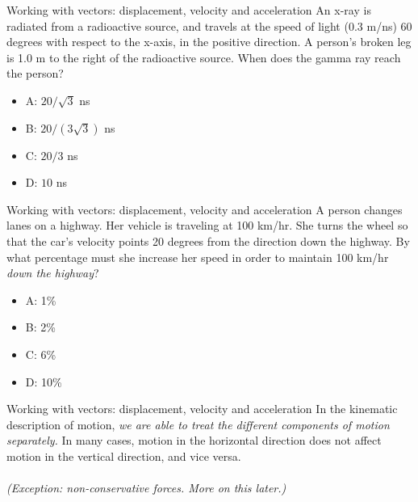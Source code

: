 \documentclass{beamer}
\begin{document}
\begin{frame}{Working with vectors: displacement, velocity and acceleration}
An x-ray is radiated from a radioactive source, and travels at the speed of light (0.3 m/ns) 60 degrees with respect to the x-axis, in the positive direction.  A person's broken leg is 1.0 m to the right of the radioactive source.  When does the gamma ray reach the person?
\begin{itemize}
\item A: $20/\sqrt{3}$ ns
\item B: $20/(3\sqrt{3})$ ns
\item C: $20/3$ ns
\item D: $10$ ns
\end{itemize}
\end{frame}

\begin{frame}{Working with vectors: displacement, velocity and acceleration}
A person changes lanes on a highway.  Her vehicle is traveling at 100 km/hr.  She turns the wheel so that the car's velocity points 20 degrees from the direction down the highway.  By what percentage must she increase her speed in order to maintain 100 km/hr \textit{down the highway}?
\begin{itemize}
\item A: 1\%
\item B: 2\%
\item C: 6\%
\item D: 10\%
\end{itemize}
\end{frame}

\begin{frame}{Working with vectors: displacement, velocity and acceleration}
In the kinematic description of motion, \alert{\textit{we are able to treat the different components of motion separately.}}  In many cases, motion in the horizontal direction does not affect motion in the vertical direction, and vice versa.\\
\vspace{0.5cm}
\small
{} \\
\vspace{1cm}
\textit{(Exception: non-conservative forces.  More on this later.)}
\end{frame}
\end{document}
